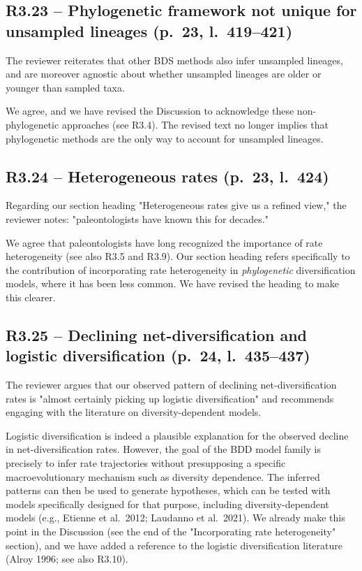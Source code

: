 \documentclass[11pt]{article}
\newcommand{\response}[1]{\noindent\textcolor{resp}{#1}\medskip}
\begin{document}
\subsection*{R3.23 -- Phylogenetic framework not unique for unsampled lineages (p.\ 23, l.\ 419--421)}

The reviewer reiterates that other BDS methods also infer unsampled lineages, and are moreover agnostic about whether unsampled lineages are older or younger than sampled taxa.

\response{We agree, and we have revised the Discussion to acknowledge these non-phylogenetic approaches (see R3.4). The revised text no longer implies that phylogenetic methods are the only way to account for unsampled lineages.}

\subsection*{R3.24 -- Heterogeneous rates (p.\ 23, l.\ 424)}

Regarding our section heading "Heterogeneous rates give us a refined view," the reviewer notes: "paleontologists have known this for decades."

\response{We agree that paleontologists have long recognized the importance of rate heterogeneity (see also R3.5 and R3.9). Our section heading refers specifically to the contribution of incorporating rate heterogeneity in \emph{phylogenetic} diversification models, where it has been less common. We have revised the heading to make this clearer.}

\subsection*{R3.25 -- Declining net-diversification and logistic diversification (p.\ 24, l.\ 435--437)}

The reviewer argues that our observed pattern of declining net-diversification rates is "almost certainly picking up logistic diversification" and recommends engaging with the literature on diversity-dependent models.

\response{Logistic diversification is indeed a plausible explanation for the observed decline in net-diversification rates. However, the goal of the BDD model family is precisely to infer rate trajectories without presupposing a specific macroevolutionary mechanism such as diversity dependence. The inferred patterns can then be used to generate hypotheses, which can be tested with models specifically designed for that purpose, including diversity-dependent models (e.g., Etienne et al.\ 2012; Laudanno et al.\ 2021). We already make this point in the Discussion (see the end of the "Incorporating rate heterogeneity" section), and we have added a reference to the logistic diversification literature (Alroy 1996; see also R3.10).}
\end{document}
